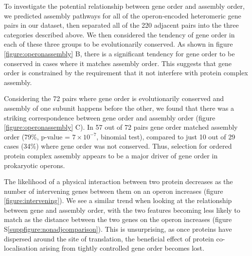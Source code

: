 \documentclass[a4paper,11pt,twoside,openright]{scrbook}
\begin{document}
To investigate the potential relationship between gene order and assembly order, we predicted assembly pathways for all of the operon-encoded heteromeric gene pairs in our dataset, then separated all of the 220 adjacent pairs into the three categories described above. We then considered the tendency of gene order in each of these three groups to be evolutionarily conserved. As shown in figure \ref{figure:operonassembly} B, there is a significant tendency for gene order to be conserved in cases where it matches assembly order. This suggests that gene order is constrained by the requirement that it not interfere with protein complex assembly.

Considering the 72 pairs where gene order is evolutionarily conserved and assembly of one subunit happens before the other, we found that there was a striking correspondence between gene order and assembly order (figure \ref{figure:operonassembly} C). In 57 out of 72 pairs gene order matched assembly order (79\%, p-value = \(7 \times 10^{-7}\), binomial test), compared to just 10 out of 29 cases (34\%) where gene order was not conserved. Thus, selection for ordered protein complex assembly appears to be a major driver of gene order in prokaryotic operons.

The likelihood of a physical interaction between two protein decreases as the number of intervening genes between them on an operon increases (figure \ref{figure:intervening}). We see a similar trend when looking at the relationship between gene and assembly order, with the two features becoming less likely to match as the distance between the two genes on the operon increases (figure S\ref{suppfigure:nonadjcomparison}). This is unsurprising, as once proteins have dispersed around the site of translation, the beneficial effect of protein co-localisation arising from tightly controlled gene order becomes lost.
\end{document}
